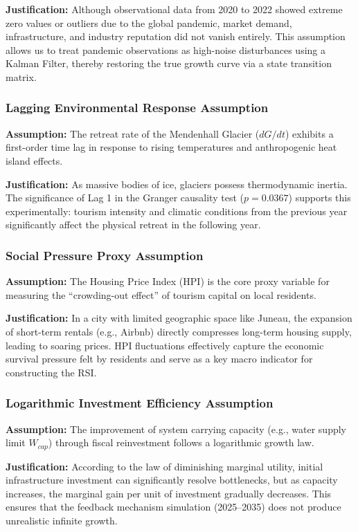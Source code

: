 \documentclass{mcmthesis}
\begin{document}
\textbf{Justification:} Although observational data from 2020 to 2022 showed extreme zero values or outliers due to the global pandemic, market demand, infrastructure, and industry reputation did not vanish entirely. This assumption allows us to treat pandemic observations as high-noise disturbances using a Kalman Filter, thereby restoring the true growth curve via a state transition matrix.

\subsubsection{Lagging Environmental Response Assumption}
\textbf{Assumption:} The retreat rate of the Mendenhall Glacier ($dG/dt$) exhibits a first-order time lag in response to rising temperatures and anthropogenic heat island effects.

\textbf{Justification:} As massive bodies of ice, glaciers possess thermodynamic inertia. The significance of Lag 1 in the Granger causality test ($p = 0.0367$) supports this experimentally: tourism intensity and climatic conditions from the previous year significantly affect the physical retreat in the following year.

\subsubsection{Social Pressure Proxy Assumption}
\textbf{Assumption:} The Housing Price Index (HPI) is the core proxy variable for measuring the ``crowding-out effect'' of tourism capital on local residents.

\textbf{Justification:} In a city with limited geographic space like Juneau, the expansion of short-term rentals (e.g., Airbnb) directly compresses long-term housing supply, leading to soaring prices. HPI fluctuations effectively capture the economic survival pressure felt by residents and serve as a key macro indicator for constructing the RSI.

\subsubsection{Logarithmic Investment Efficiency Assumption}
\textbf{Assumption:} The improvement of system carrying capacity (e.g., water supply limit $W_{cap}$) through fiscal reinvestment follows a logarithmic growth law.

\textbf{Justification:} According to the law of diminishing marginal utility, initial infrastructure investment can significantly resolve bottlenecks, but as capacity increases, the marginal gain per unit of investment gradually decreases. This ensures that the feedback mechanism simulation (2025--2035) does not produce unrealistic infinite growth.
\end{document}
